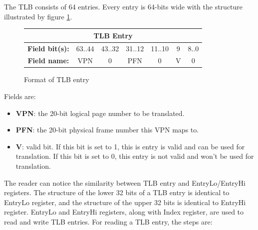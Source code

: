 \documentclass[oneside]{book}
\begin{document}
The TLB consists of 64 entries. Every entry is 64-bits wide
with the structure illustrated by figure \ref{tlb_entry}.

\begin{figure}[H]
\begin{center}
\begin{tabular}{|c|c|c|c|c|c|c|}

\hline \multicolumn{7}{|c|}{TLB Entry} \\

\hline \textbf{Field bit(s):} & 63..44 & 43..32 & 31..12 & 11..10 & 9 & 8..0 \\

\hline \textbf{Field name:}   & VPN    & 0      & PFN    & 0      & V & 0    \\

\hline

\end{tabular}

\end{center}
\caption{Format of TLB entry}
\label{tlb_entry}
\end{figure}

Fields are:

\begin{itemize}

\item \textbf{VPN}: the 20-bit logical page number to be translated.

\item \textbf{PFN}: the 20-bit physical frame number this VPN maps to.

\item \textbf{V}: valid bit. If this bit is set to 1, this is entry
      is valid and can be used for translation. If this bit is set to
      0, this entry is not valid and won't be used for translation.

\end{itemize}

The reader can notice the similarity between TLB entry and EntryLo/EntryHi
registers. The structure of the lower 32 bits of a TLB entry is identical
to EntryLo register, and the structure of the upper 32 bits is identical
to EntryHi register. EntryLo and EntryHi registers, along with Index
register, are used to read and write TLB entries. For reading a TLB
entry, the steps are:
\end{document}

